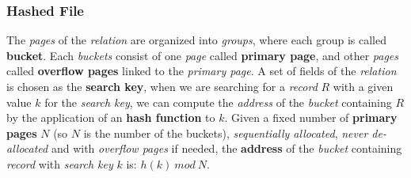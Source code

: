 \documentclass{article}
\begin{document}
\subsubsection{Hashed File}
The \emph{pages} of the \emph{relation} are organized into \emph{groups}, where each group is called \textbf{bucket}. Each \emph{buckets} consist of one \emph{page} called \textbf{primary page}, and other \emph{pages} called \textbf{overflow pages} linked to the \emph{primary page}. A set of fields of the \emph{relation} is chosen as the \textbf{search key}, when we are searching for a \emph{record} $R$ with a given value $k$ for the \emph{search key}, we can compute the \emph{address} of the \emph{bucket} containing $R$ by the application of an \textbf{hash function} to $k$. Given a fixed number of \textbf{primary pages} $N$ (so $N$ is the number of the buckets), \emph{sequentially allocated}, \emph{never de-allocated} and with \emph{overflow pages} if needed, the \textbf{address} of the \emph{bucket} containing \emph{record} with \emph{search key} $k$ is: $h(k)\ mod\ N$.
\end{document}
